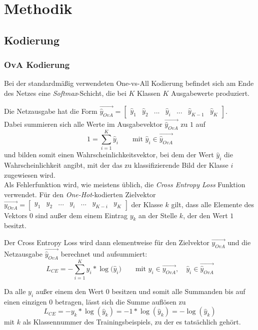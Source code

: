 \chapter{Methodik}
\label{ch:methodik}

\section{Kodierung}
\label{ch:methodik_kodierung}
\subsection{OvA Kodierung}
Bei der standardmäßig verwendeten One-vs-All Kodierung befindet sich am Ende des Netzes eine \textit{Softmax}-Schicht, die bei $K$ Klassen $K$ Ausgabewerte produziert.

Die Netzausgabe hat die Form $\overrightarrow{\widehat{y}_{OvA}} = \begin{bmatrix}
\widehat{y}_1 & \widehat{y}_2 & ... & \widehat{y}_i & ... & \widehat{y}_{K-1} & \widehat{y}_K
\end{bmatrix} $.\\

Dabei summieren sich alle Werte im Ausgabevektor $\overrightarrow{\widehat{y}_{OvA}}$ zu $1$ auf 
\[1 = \sum_{i=1}^K{\widehat{y}_i} \qquad \text{mit } \widehat{y}_i \in \overrightarrow{\widehat{y}_{OvA}}\]
und bilden somit einen Wahrscheinlichkeitsvektor, bei dem der Wert $\widehat{y}_i$ die Wahrscheinlichkeit angibt, mit der das zu klassifizierende Bild der Klasse $i$ zugewiesen wird.\\

Als Fehlerfunktion wird, wie meistens üblich, die \textit{Cross Entropy Loss} Funktion verwendet. Für den \textit{One-Hot}-kodierten Zielvektor $\overrightarrow{y_{OvA}} = \begin{bmatrix} y_1 & y_2 & ... & y_i & ... & y_{K-i} & y_K \end{bmatrix}$ der Klasse $k$ gilt, dass alle Elemente des Vektors $0$ sind außer dem einem Eintrag $y_k$ an der Stelle $k$, der den Wert $1$ besitzt.


Der Cross Entropy Loss wird dann elementweise für den Zielvektor $\overrightarrow{y_{OvA}}$ und die Netzausgabe $\overrightarrow{\widehat{y}_{OvA}}$ berechnet und aufsummiert:
\[L_{CE} = - \sum_{i=1}^K{y_i * \log{(\widehat{y}_i})} \qquad \text{mit } y_i \in \overrightarrow{y_{OvA}}, \quad \widehat{y}_i \in \overrightarrow{\widehat{y}_{OvA}}\]

Da alle $y_i$ außer einem den Wert $0$ besitzen und somit alle Summanden bis auf einen einzigen $0$ betragen, lässt sich die Summe auflösen zu 
\[L_{CE} = - y_k * \log{(\widehat{y}_k)} = -1 * \log{(\widehat{y}_k)} = - \log{(\widehat{y}_k)}\]
mit $k$ als Klassennummer des Trainingsbeispiels, zu der es tatsächlich gehört.


